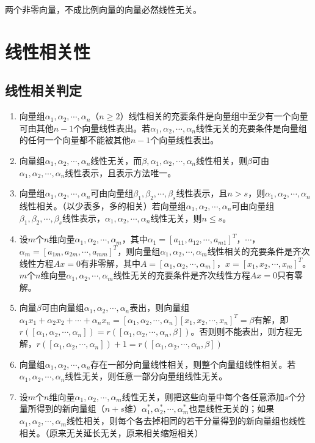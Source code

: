 \documentclass[UTF8, 12pt]{ctexart}
\begin{document}
两个非零向量，不成比例向量的向量必然线性无关。

\section{线性相关性}

\subsection{线性相关判定}

\begin{enumerate}
    \item 向量组$\alpha_1,\alpha_2,\cdots,\alpha_n$（$n\geqslant2$）线性相关的充要条件是向量组中至少有一个向量可由其他$n-1$个向量线性表出。若$\alpha_1,\alpha_2,\cdots,\alpha_n$线性无关的充要条件是向量组的任何一个向量都不能被其他$n-1$个向量线性表出。
    \item 向量组$\alpha_1,\alpha_2,\cdots,\alpha_n$线性无关，而$\beta,\alpha_1,\alpha_2,\cdots,\alpha_n$线性相关，则$\beta$可由$\alpha_1,\alpha_2,\cdots,\alpha_n$线性表示，且表示方法唯一。
    \item 向量组$\alpha_1,\alpha_2,\cdots,\alpha_n$可由向量组$\beta_1,\beta_2,\cdots,\beta_s$线性表示，且$n>s$，则$\alpha_1,\alpha_2,\cdots,\alpha_n$线性相关。（以少表多，多的相关）若向量组$\alpha_1,\alpha_2,\cdots,\alpha_n$可由向量组$\beta_1,\beta_2,\cdots,\beta_s$线性表示，$\alpha_1,\alpha_2,\cdots,\alpha_n$线性无关，则$n\leqslant s$。
    \item 设$m$个$n$维向量$\alpha_1,\alpha_2,\cdots,\alpha_m$，其中$\alpha_1=[a_{11},a_{12},\cdots,a_{m1}]^T$，$\cdots$，$\alpha_m=[a_{1m},a_{2m},\cdots,a_{mm}]^T$，则向量组$\alpha_1,\alpha_2,\cdots,\alpha_m$线性相关的充要条件是齐次线性方程$Ax=0$有非零解，其中$A=[\alpha_1,\alpha_2,\cdots,\alpha_m]$，$x=[x_1,x_2,\cdots,x_m]^T$。$m$个$n$维向量$\alpha_1,\alpha_2,\cdots,\alpha_m$线性无关的充要条件是齐次线性方程$Ax=0$只有零解。
    \item 向量$\beta$可由向量组$\alpha_1,\alpha_2,\cdots,\alpha_n$表出，则向量组$\alpha_1x_1+\alpha_2x_2+\cdots+\alpha_nx_n=[\alpha_1,\alpha_2,\cdots,\alpha_n][x_1,x_2,\cdots,x_n]^T=\beta$有解，即$r([\alpha_1,\alpha_2,\cdots,\alpha_n])=r([\alpha_1,\alpha_2,\cdots,\alpha_n,\beta])$。否则则不能表出，则方程无解，$r([\alpha_1,\alpha_2,\cdots,\alpha_n])+1=r([\alpha_1,\alpha_2,\cdots,\alpha_n,\beta])$
    \item 向量组$\alpha_1,\alpha_2,\cdots,\alpha_n$存在一部分向量线性相关，则整个向量组线性相关。若$\alpha_1,\alpha_2,\cdots,\alpha_n$线性无关，则任意一部分向量组线性无关。
    \item 设$m$个$n$维向量$\alpha_1,\alpha_2,\cdots,\alpha_m$线性无关，则把这些向量中每个各任意添加$s$个分量所得到的新向量组（$n+s$维）$\alpha_1^*,\alpha_2^*,\cdots,\alpha_m^*$也是线性无关的；如果$\alpha_1,\alpha_2,\cdots,\alpha_m$线性相关，则每个各去掉相同的若干分量得到的新向量组也线性相关。（原来无关延长无关，原来相关缩短相关）
\end{enumerate}
\end{document}
